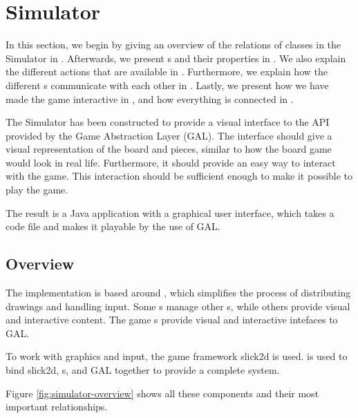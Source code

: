 \section{Simulator}
\label{sec:simulator}

In this section, we begin by giving an overview of the relations of classes in
the Simulator in . Afterwards, we present
s and their properties in . We also explain
the different actions that are available in . Furthermore,
we explain how the different s communicate with each other in
. Lastly, we present how we have made the game
interactive in , and how everything is connected in
.


The Simulator has been constructed to provide a visual interface to the API
provided by the Game Abstraction Layer (GAL). The interface should give a visual
representation of the board and pieces, similar to how the board game would look
in real life. Furthermore, it should provide an easy way to interact with the
game. This interaction should be sufficient enough to make it possible to play
the game.

The result is a Java application with a graphical user interface, which takes a
\productname{} code file and makes it playable by the use of GAL.

\subsection{Overview}
\label{sec:overview}

The implementation is based around , which simplifies the
process of distributing drawings and handling input. Some s
manage other s, while others provide visual and interactive
content. The game s provide visual and interactive intefaces to
GAL.

To work with graphics and input, the game framework slick2d is used. 
 is used to bind slick2d, s, and GAL
together to provide a complete system.

Figure \ref{fig:simulator-overview} shows all these components and their most
important relationships.


